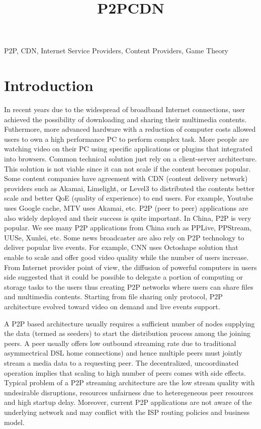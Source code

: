 \documentclass[paper]{ieice}
\title{P2PCDN}
\begin{document}
\maketitle

\begin{summary}
\end{summary}
\begin{keywords}
P2P, CDN, Internet Service Providers, Content Providers, Game Theory 
\end{keywords}  

\section{Introduction}\label{intro}
In recent years due to the widespread of broadband Internet connections, user achieved the possibility of downloading and sharing their multimedia contents.
Futhermore, more advanced hardware with a reduction of computer costs allowed users to own a high performance PC to perform complex task.
More people are watching video on their PC using specific applications or plugins that integrated into browsers.
Common technical solution just rely on a client-server architecture.
This solution is not viable since it can not scale if the content becomes popular.
Some content companies have agreement with CDN (content delivery network) providers such as Akamai, Limelight, or Level3 to distributed the contents better scale and better QoE (quality of experience) to end users.
For example, Youtube uses Google cache, MTV uses Akamai, etc. P2P (peer to peer) applications are also widely deployed and their success is quite important. 
In China, P2P is very popular. 
We see many P2P applications from China such as PPLive, PPStream, UUSe, Xunlei, etc.  
Some news broadcaster are also rely on P2P technology to deliver popular live events.
For example, CNN uses Octoshape solution that enable to scale and offer good video quality while the number of users increase.
From Internet provider point of view, the diffusion of powerful computers in users side suggested that it could be possible to delegate a portion of computing or storage tasks to the users thus creating P2P networks where users can share files and multimedia contents.
Starting from file sharing only protocol, P2P architecture evolved toward video on demand and live events support. 

A P2P based architecture usually requires a sufficient number of nodes supplying the data (termed as seeders) to start the distribution process among the joining peers.
A peer usually offers low outbound streaming rate due to traditional asymmectrical DSL home connections) and hence multiple peers must jointly stream a media data to a requesting peer. 
The decentralized, uncoordinated operation implies that scaling to high number of peers comes with side effects.
Typical problem of a P2P streaming architecture are the low stream quality with undesirable disruptions, resources unfairness due to heteregeneous peer resources and high startup delay.
Moreover, current P2P applications are not aware of the underlying network and may conflict with the ISP routing policies and business model.
\end{document}

